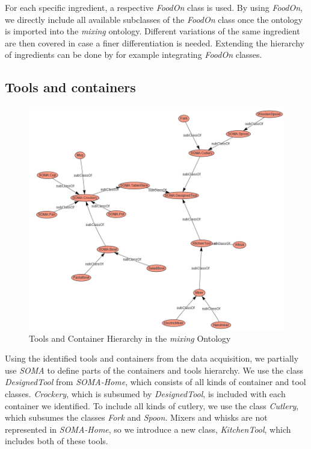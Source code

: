 For each specific ingredient, a respective \textit{FoodOn}\cite{dooley2018foodon} class is used. By using \textit{FoodOn}, we directly include all available subclasses of the 
\textit{FoodOn} class once the ontology is imported into the \textit{mixing} ontology.
Different variations of the same ingredient are then covered in case a finer differentiation is needed. 
Extending the hierarchy of ingredients can be done by for example integrating \textit{FoodOn} classes.  

\subsection{Tools and containers}
\label{sec:toolsandcontainers}

\begin{figure}[H]
    \includegraphics[scale=0.45]{Graphics/classHierarchy/tools_hierarchy.png}
    \centering
    \caption{Tools and Container Hierarchy in the \textit{mixing} Ontology}
\end{figure}

Using the identified tools and containers from the data acquisition, we partially use \textit{SOMA} \cite{soma} to define parts of the containers and tools hierarchy.
We use the class \textit{DesignedTool} from \textit{SOMA-Home}, which consists of all kinds of container and tool classes. 
\textit{Crockery}, which is subsumed by \textit{DesignedTool}, is included with each container we identified. 
To include all kinds of cutlery, we use the class \textit{Cutlery}, which subsumes the classes \textit{Fork} and \textit{Spoon}. 
Mixers and whisks are not represented in \textit{SOMA-Home}, so we introduce a new class, \textit{KitchenTool}, which includes both of these tools.

